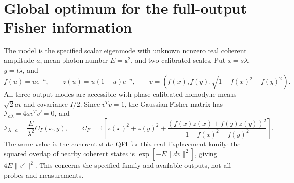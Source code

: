 \section{Global optimum for the full-output Fisher information}
The model is the specified scalar eigenmode with unknown nonzero real coherent amplitude $a$, mean photon number $E=a^2$, and two calibrated scales. Put $x=s\lambda$, $y=t\lambda$, and
\[
f(u)=ue^{-u},\qquad z(u)=u(1-u)e^{-u},\qquad
v=(f(x),f(y),\sqrt{1-f(x)^2-f(y)^2}).
\]
All three output modes are accessible with phase-calibrated homodyne means $\sqrt2 a v$ and covariance $I/2$. Since $v^Tv=1$, the Gaussian Fisher matrix has $\mathcal I_{a\lambda}=4a v^Tv'=0$, and
\[
\mathcal I_{\lambda\mid a}=\frac E{\lambda^2}C_F(x,y),\qquad
C_F=4\left[z(x)^2+z(y)^2+
\frac{(f(x)z(x)+f(y)z(y))^2}{1-f(x)^2-f(y)^2}\right].
\]
The same value is the coherent-state QFI for this real displacement family: the squared overlap of nearby coherent states is $\exp[-E\|dv\|^2]$, giving $4E\|v'\|^2$. This concerns the specified family and available outputs, not all probes and measurements.


